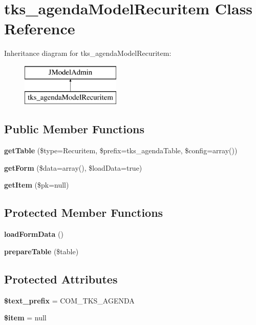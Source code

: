 \section{tks\+\_\+agenda\+Model\+Recuritem Class Reference}
\label{classtks__agenda_model_recuritem}
Inheritance diagram for tks\+\_\+agenda\+Model\+Recuritem\+:\begin{figure}[H]
\begin{center}
\leavevmode
\includegraphics[height=2.000000cm]{classtks__agenda_model_recuritem}
\end{center}
\end{figure}
\subsection*{Public Member Functions}
\begin{DoxyCompactItemize}
\item 
\textbf{ get\+Table} (\$type=\textquotesingle{}Recuritem\textquotesingle{}, \$prefix=\textquotesingle{}tks\+\_\+agenda\+Table\textquotesingle{}, \$config=array())
\item 
\textbf{ get\+Form} (\$data=array(), \$load\+Data=true)
\item 
\textbf{ get\+Item} (\$pk=null)
\end{DoxyCompactItemize}
\subsection*{Protected Member Functions}
\begin{DoxyCompactItemize}
\item 
\textbf{ load\+Form\+Data} ()
\item 
\textbf{ prepare\+Table} (\$table)
\end{DoxyCompactItemize}
\subsection*{Protected Attributes}
\begin{DoxyCompactItemize}
\item 
\textbf{ \$text\+\_\+prefix} = \textquotesingle{}C\+O\+M\+\_\+\+T\+K\+S\+\_\+\+A\+G\+E\+N\+DA\textquotesingle{}
\item 
\textbf{ \$item} = null
\end{DoxyCompactItemize}


